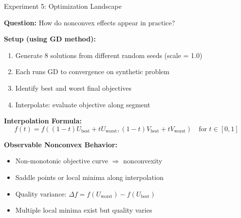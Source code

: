 \documentclass[aspectratio=169,usenames,dvipsnames]{beamer}
\begin{document}
\begin{frame}{Experiment 5: Optimization Landscape}

\textbf{Question:} How do nonconvex effects appear in practice?

\vspace{0.3cm}

\textbf{Setup (using GD method):}
\begin{enumerate}
  \item Generate 8 solutions from different random seeds (scale = 1.0)
  \item Each runs GD to convergence on synthetic problem
  \item Identify best and worst final objectives
  \item Interpolate: evaluate objective along segment
\end{enumerate}

\vspace{0.3cm}

\textbf{Interpolation Formula:}
\[
f(t) = f((1-t)U_{\text{best}} + tU_{\text{worst}}, (1-t)V_{\text{best}} + tV_{\text{worst}}) 
\quad \text{for } t \in [0, 1]
\]

\vspace{0.3cm}

\textbf{Observable Nonconvex Behavior:}
\begin{itemize}
  \item Non-monotonic objective curve $\Rightarrow$ nonconvexity
  \item Saddle points or local minima along interpolation
  \item Quality variance: $\Delta f = f(U_{\text{worst}}) - f(U_{\text{best}})$
  \item Multiple local minima exist but quality varies
\end{itemize}

\end{frame}
\end{document}
